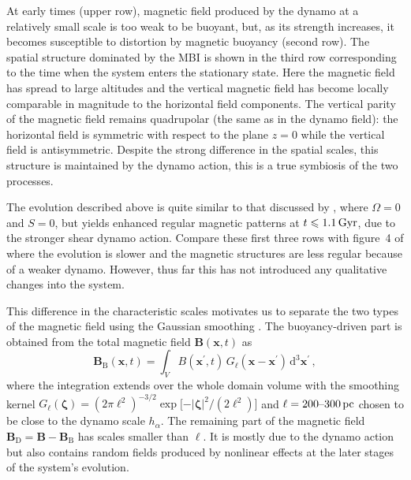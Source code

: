 \documentclass[fleqn,usenatbib]{mnras}
\newcommand{\dd}{\mathrm{d}}        %
\newcommand\D{_\text{D}} %
\renewcommand\vec[1]{\bm{#1}}%
\newcommand{\BB}{\vec{B}} %
\newcommand{\p}{\,{\rm pc}}     %
\newcommand{\Gyr}{\,{\rm Gyr}}  %
\begin{document}
At early times (upper row), magnetic field produced by the dynamo at a
relatively small scale is too weak to be buoyant, but, as its strength
increases, it {becomes susceptible to distortion} by magnetic buoyancy
(second row).  The spatial structure dominated by the MBI is shown in the third
row corresponding to the time when the system enters the stationary state. Here
the magnetic field has spread to large altitudes and the vertical magnetic
field has become locally comparable in magnitude to the horizontal {field}
components. The vertical parity of the magnetic field remains quadrupolar (the
same as in the dynamo field): the horizontal field is symmetric with respect to
the plane $z=0$ while the vertical field is antisymmetric. Despite the strong
difference in the spatial scales, this structure is maintained by the dynamo
action, this is a true symbiosis of the two processes.

The evolution described above is quite similar to that discussed by
\citet{QSTGB23}, where $\Omega=0$ and $S=0${, but yields} enhanced regular
magnetic patterns at $t\leq1.1\Gyr$, {due to the stronger shear dynamo
action}.  {Compare these first three rows} with figure~4 of \citet{QSTGB23}
where the evolution is slower and the magnetic structures are less regular
because of a weaker dynamo. However, thus far this has not introduced any
qualitative changes into the system.

This difference {in the characteristic scales motivates} us to separate the
two types of the magnetic field using the Gaussian smoothing \citep{Gent2013}.
The buoyancy-driven part is obtained from the total magnetic field
$\vec{B}(\vec{x},t)$ as
\begin{equation}\label{GS}
    \BB_\text{B}(\vec{x},t) = \int_{V}B(\vec{x}^\prime,t)\,G_{\ell}(\vec{x}-\vec{x}^\prime)\,\dd^3\vec{x}^\prime\,,
\end{equation}
where the integration extends over the whole domain volume with the smoothing
kernel $G_\ell(\vec{\zeta}) =
(2\pi\ell^2)^{-3/2}\exp{[-|\vec{\zeta}|^2/(2\ell^2)}]$ and $\ell =
200\text{--}300\p$ chosen to be close to the dynamo scale $h_\alpha$. The
remaining part of the magnetic field $\vec{B}\D = \vec{B}-\vec{B}_\text{B}$ has
scales smaller than $\ell$. It is mostly due to the dynamo action but also
contains random fields produced by nonlinear effects at the later stages of the
system's evolution.
\end{document}
